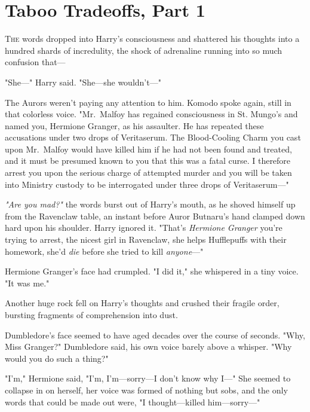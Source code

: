 \chapter{Taboo Tradeoffs, Part 1}

\lettrine{T}{he} words dropped into Harry's consciousness and shattered his thoughts into a
hundred shards of incredulity, the shock of adrenaline running into so much
confusion that\mbox{---}

"She\mbox{---}" Harry said. "She---she wouldn't---"

The Aurors weren't paying any attention to him. Komodo spoke again, still in
that colorless voice. "Mr.~Malfoy has regained consciousness in St. Mungo's and
named you, Hermione Granger, as his assaulter. He has repeated these
accusations under two drops of Veritaserum. The Blood-Cooling Charm you cast
upon Mr.~Malfoy would have killed him if he had not been found and treated, and
it must be presumed known to you that this was a fatal curse. I therefore
arrest you upon the serious charge of attempted murder and you will be taken
into Ministry custody to be interrogated under three drops of Veritaserum\mbox{---}"

\emph{"Are you mad?"} the words burst out of Harry's mouth, as he shoved
himself up from the Ravenclaw table, an instant before Auror Butnaru's hand
clamped down hard upon his shoulder. Harry ignored it. "That's \emph{Hermione
Granger} you're trying to arrest, the nicest girl in Ravenclaw, she helps
Hufflepuffs with their homework, she'd \emph{die} before she tried to kill
\emph{anyone}\mbox{---}"

Hermione Granger's face had crumpled. "I did it," she whispered in a tiny
voice. "It was me."

Another huge rock fell on Harry's thoughts and crushed their fragile order,
bursting fragments of comprehension into dust.

Dumbledore's face seemed to have aged decades over the course of seconds. "Why,
Miss Granger?" Dumbledore said, his own voice barely above a whisper. "Why
would you do such a thing?"

"I'm," Hermione said, "I'm, I'm---sorry---I don't know why I\mbox{---}" She seemed to
collapse in on herself, her voice was formed of nothing but sobs, and the only
words that could be made out were, "I thought---killed him---sorry\mbox{---}"

